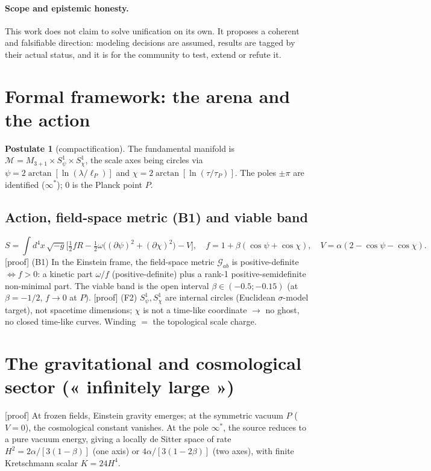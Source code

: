 \documentclass[11pt,a4paper]{article}
\newcommand{\statut}[1]{{\footnotesize\textsf{[#1]}}}
\theoremstyle{definition}
\newtheorem{postulate}{Postulate}
\begin{document}
\paragraph{Scope and epistemic honesty.} This work does not claim to solve unification on its
own. It proposes a coherent and falsifiable direction: modeling decisions are assumed, results
are tagged by their actual status, and it is for the community to test, extend or refute it.

\section{Formal framework: the arena and the action}
\begin{postulate}[compactification]
The fundamental manifold is $\mathcal{M}=M_{3+1}\times S^1_\psi\times S^1_\chi$, the scale
axes being circles via $\psi=2\arctan[\ln(\lambda/\ell_P)]$ and
$\chi=2\arctan[\ln(\tau/\tau_P)]$. The poles $\pm\pi$ are identified ($\infty^*$); $0$ is the
Planck point $P$.
\end{postulate}

\subsection{Action, field-space metric (B1) and viable band}
\begin{equation}
S=\int d^4x\,\sqrt{-g}\Big[\tfrac12 fR-\tfrac12\omega\big((\partial\psi)^2+(\partial\chi)^2\big)-V\Big],
\quad f=1+\beta(\cos\psi+\cos\chi),\quad V=\alpha(2-\cos\psi-\cos\chi).
\end{equation}
\statut{proof} (B1) In the Einstein frame, the field-space metric $\mathcal{G}_{ab}$ is
positive-definite $\Leftrightarrow f>0$: a kinetic part $\omega/f$ (positive-definite) plus a
rank-1 positive-semidefinite non-minimal part. The viable band is the open interval
$\beta\in(-0.5;-0.15)$ (at $\beta=-1/2$, $f\to0$ at $P$).
\statut{proof} (F2) $S^1_\psi,S^1_\chi$ are internal circles (Euclidean $\sigma$-model
target), not spacetime dimensions; $\chi$ is not a time-like coordinate $\to$ no ghost, no
closed time-like curves. Winding $=$ the topological scale charge.

\section{The gravitational and cosmological sector (« infinitely large »)}\label{sec:cosmo}
\statut{proof} At frozen fields, Einstein gravity emerges; at the symmetric vacuum $P$
($V=0$), the cosmological constant vanishes. At the pole $\infty^*$, the source reduces to a
pure vacuum energy, giving a locally de Sitter space of rate $H^2=2\alpha/[3(1-\beta)]$ (one
axis) or $4\alpha/[3(1-2\beta)]$ (two axes), with finite Kretschmann scalar $K=24H^4$.
\end{document}
